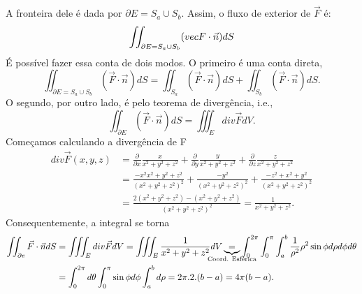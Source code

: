 \documentclass{article}
\begin{document}
A fronteira dele \'e dada por $\partial{E} = S_{a}\cup{S_{b}}$. Assim, o fluxo de exterior de $\vec{F}$ \'e:
  $$
  \iint_{\partial E = S_{a}\cup{S_{b}}} (\\vec{F}\cdot\vec{n})dS
  $$
\'E poss\'ivel fazer essa conta de dois modos. O primeiro \'e uma conta direta,
  $$
  \iint_{\partial E = S_{a}\cup{S_{b}}} (\vec{F}\cdot\vec{n})dS = \iint_{S_{a}}(\vec{F}\cdot\vec{n})dS + \iint_{S_{b}}(\vec{F}\cdot\vec{n})dS.
  $$
O segundo, por outro lado, \'e pelo teorema de diverg\^encia, i.e.,
  $$
  \iint_{\partial{E}}(\vec{F}\cdot\vec{n})dS = \iiint_{E}div \vec{F}dV.
  $$
Come\c camos calculando a diverg\^encia de F
 \begin{align*}
   div \vec{F}(x, y, z) &= \frac{\partial{}}{\partial{x}}\frac{x}{x^{2} + y^{2} + z^{2}} + \frac{\partial{}}{\partial{y}}\frac{y}{x^{2} + y^{2} + z^{2}} +
   \frac{\partial{}}{\partial{z}}\frac{z}{x^{2} + y^{2} + z^{2}} \\
    &= \frac{-x^{2}x^{2} + y^{2} + z^{2}}{(x^{2} + y^{2} + z^{2})^{2}}  + \frac{-y^{2}}{(x^{2} + y^{2} + z^{2})^{2}} + \frac{-z^{2} + x^{2} + y^{2}}{(x^{2} + y^{2} + z^{2})^{2}} \\
    &= \frac{2(x^{2} + y^{2} + z^{2}) - (x^{2} + y^{2} + z^{2})}{(x^{2} + y^{2} + z^{2})^{2}} = \frac{1}{x^{2} + y^{2} + z^{2}}.
 \end{align*}
 Consequentemente, a integral se torna
 \begin{align*}
   \iint_{\partial{e}}\vec{F}\cdot \vec{n}dS &= \iiint_{E}div \vec{F}dV = \iiint_{E}\frac{1}{x^{2} + y^{2} + z^{2}}dV \underbrace{=}_{\mathclap{\substack{\text{Coord. Esf\'erica}}}}
   \int_{0}^{2\pi}\int_{0}^{\pi}\int_{a}^{b}\frac{1}{\rho^2}\rho^2\sin{\phi}d\rho d\phi d\theta \\
   &= \int_{0}^{2\pi}d\theta \int_{0}^{\pi}\sin{\phi}d\phi \int_{a}^{b}d\rho = 2\pi.2.(b-a) = 4\pi(b - a).
 \end{align*}
 
\end{document}
